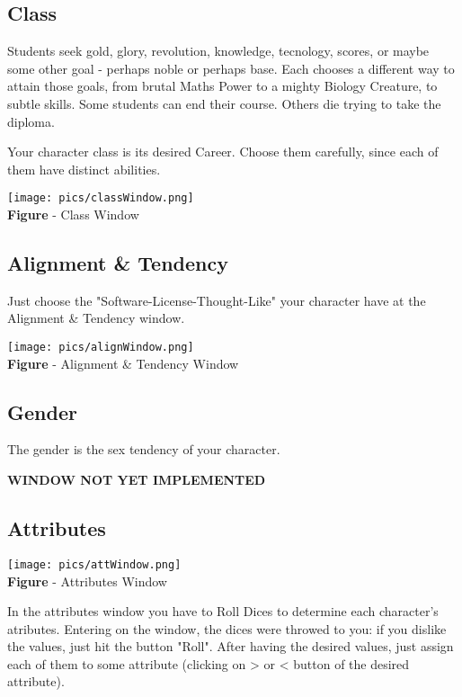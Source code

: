 \documentclass[ letterpaper,12pt]{article}
\begin{document}
\subsection{Class}

Students seek gold, glory, revolution, knowledge, tecnology, scores, or maybe
some other goal - perhaps noble or perhaps base. Each chooses a different way
to attain those goals, from brutal Maths Power to a mighty Biology Creature, to
subtle skills. Some students can end their course. Others die trying to take
the diploma.

Your character class is its desired Career. Choose them carefully, since each
of them have distinct abilities.

\begin{center}
  \texttt{[image: pics/classWindow.png]}
\\{\bf Figure} - Class Window
\end{center}


\subsection{Alignment \& Tendency}

Just choose the "Software-License-Thought-Like" your character have at the
Alignment \& Tendency window.

\begin{center}
  \texttt{[image: pics/alignWindow.png]}
\\{\bf Figure} - Alignment \& Tendency Window
\end{center}

\subsection{Gender}

The gender is the sex tendency of your character.

{\bf WINDOW NOT YET IMPLEMENTED}

\subsection{Attributes}

\begin{center}
  \texttt{[image: pics/attWindow.png]}
\\{\bf Figure} - Attributes Window
\end{center}

In the attributes window you have to Roll Dices to determine each character's
atributes. Entering on the window, the dices were throwed to you: if you
dislike the values, just hit the button "Roll".  After having the desired
values, just assign each of them to some attribute (clicking on > or < button
of the desired attribute). 
\end{document}
